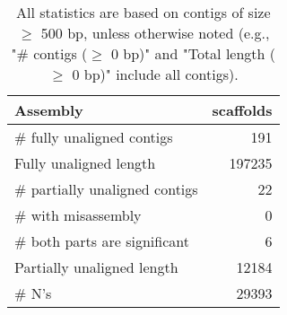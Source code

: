 \documentclass[12pt,a4paper]{article}
\begin{document}
\begin{table}[ht]
\begin{center}
\caption{All statistics are based on contigs of size $\geq$ 500 bp, unless otherwise noted (e.g., "\# contigs ($\geq$ 0 bp)" and "Total length ($\geq$ 0 bp)" include all contigs).}
\begin{tabular}{|l*{1}{|r}|}
\hline
Assembly & scaffolds \\ \hline
\# fully unaligned contigs & 191 \\ \hline
Fully unaligned length & 197235 \\ \hline
\# partially unaligned contigs & 22 \\ \hline
\hspace{5mm}\# with misassembly & 0 \\ \hline
\hspace{5mm}\# both parts are significant & 6 \\ \hline
Partially unaligned length & 12184 \\ \hline
\# N's & 29393 \\ \hline
\end{tabular}
\end{center}
\end{table}
\end{document}
